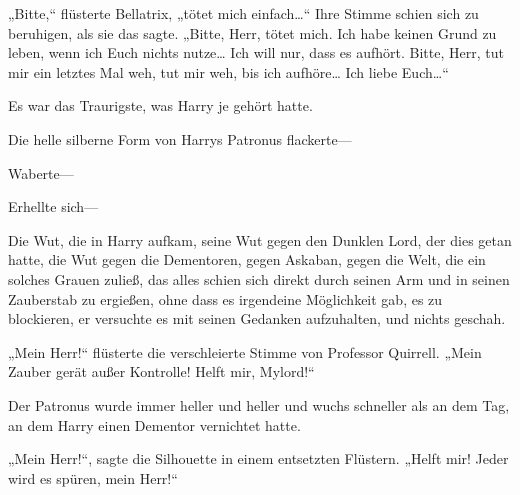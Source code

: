 „Bitte,“ flüsterte Bellatrix, „tötet mich einfach…“ Ihre Stimme schien sich zu beruhigen, als sie das sagte. „Bitte, Herr, tötet mich. Ich habe keinen Grund zu leben, wenn ich Euch nichts nutze… Ich will nur, dass es aufhört. Bitte, Herr, tut mir ein letztes Mal weh, tut mir weh, bis ich aufhöre… Ich liebe Euch…“

Es war das Traurigste, was Harry je gehört hatte.

Die helle silberne Form von Harrys Patronus flackerte—

Waberte—

Erhellte sich—

Die Wut, die in Harry aufkam, seine Wut gegen den Dunklen Lord, der dies getan hatte, die Wut gegen die Dementoren, gegen Askaban, gegen die Welt, die ein solches Grauen zuließ, das alles schien sich direkt durch seinen Arm und in seinen Zauberstab zu ergießen, ohne dass es irgendeine Möglichkeit gab, es zu blockieren, er versuchte es mit seinen Gedanken aufzuhalten, und nichts geschah.

„Mein Herr!“ flüsterte die verschleierte Stimme von Professor Quirrell. „Mein Zauber gerät außer Kontrolle! Helft mir, Mylord!“

Der Patronus wurde immer heller und heller und wuchs schneller als an dem Tag, an dem Harry einen Dementor vernichtet hatte.

„Mein Herr!“, sagte die Silhouette in einem entsetzten Flüstern. „Helft mir! Jeder wird es spüren, mein Herr!“

